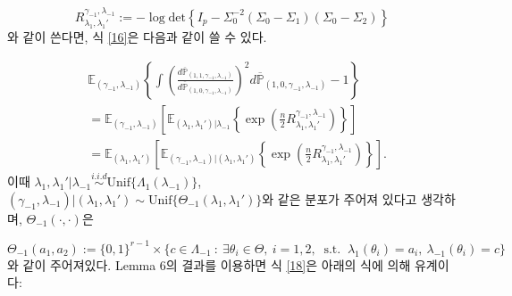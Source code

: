  \[
 R_{\lambda_1, \lambda_1'}^{\gamma_{-1}, \lambda_{-1}} := -\log \mbox{det}\left\{I_p - \Sigma_0^{-2}(\Sigma_0-\Sigma_1)(\Sigma_0-\Sigma_2) \right\}
 \]
와 같이 쓴다면, 식 \eqref{16}은 다음과 같이 쓸 수 있다.

\begin{equation}\label{18}\tag{18}
\begin{aligned}
&\mathbb{E}_{(\gamma_{-1}, \lambda_{-1})}\left\{ \int \left(\frac{d\overline{\mathbb{P}}_{(1,1,\gamma_{-1}, \lambda_{-1})} }{d\overline{\mathbb{P}}_{(1,0,\gamma_{-1}, \lambda_{-1})} } \right)^2 d\overline{\mathbb{P}}_{(1,0,\gamma_{-1}, \lambda_{-1})} -1 \right\}  \\
&= \mathbb{E}_{(\gamma_{-1}, \lambda_{-1})} \left[ \mathbb{E}_{(\lambda_1, \lambda_1')|\lambda_{-1}} \left\{\exp\left( \frac n2 R_{\lambda_1, \lambda_1'}^{\gamma_{-1}, \lambda_{-1}}\right) \right\}\right]\\
&= \mathbb{E}_{(\lambda_1, \lambda_1')}   \left[ \mathbb{E}_{(\gamma_{-1}, \lambda_{-1})|(\lambda_1, \lambda_1')}\left\{\exp\left( \frac n2 R_{\lambda_1, \lambda_1'}^{\gamma_{-1}, \lambda_{-1}}\right) \right\}\right].
\end{aligned}
\end{equation}
이때 $\lambda_1, \lambda_1' |\lambda_{-1} \overset{i.i.d}{\sim}\mbox{Unif}\{\Lambda_1(\lambda_{-1})\}$, $(\gamma_{-1}, \lambda_{-1})|(\lambda_1, \lambda_1') \sim \mbox{Unif}\{ \Theta_{-1}(\lambda_1, \lambda_1')\}$와 같은 분포가 주어져 있다고 생각하며, $\Theta_{-1}(\cdot, \cdot)$은

\[
\Theta_{-1}(a_1, a_2) := \{0,1\}^{r-1} \times \{c \in \Lambda_{-1} \ : \ \exists \theta_i \in \Theta, \ i=1,2, \ \mbox{ s.t. } \ \lambda_1(\theta_i)= a_i, \ \lambda_{-1}(\theta_i) = c \}
\]
와 같이 주어져있다. Lemma 6의 결과를 이용하면 식 \eqref{18}은 아래의 식에 의해 유계이다:

